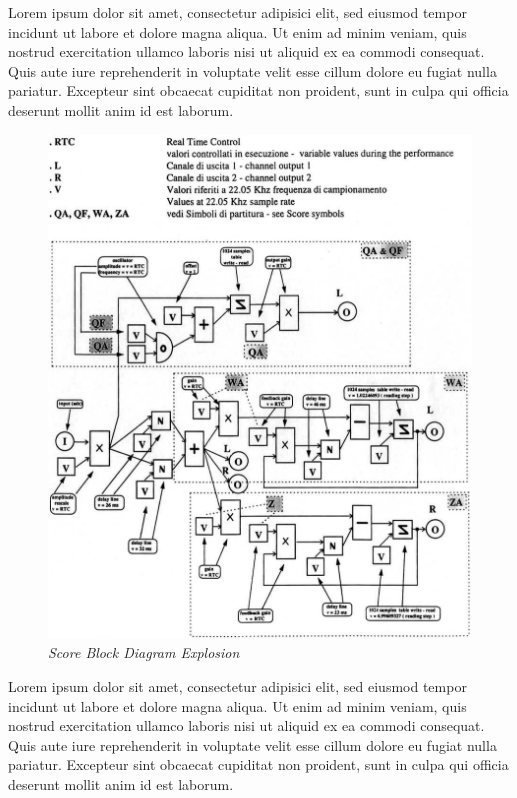 \documentclass[twoside,a4paper]{article}
\begin{document}
Lorem ipsum dolor sit amet, consectetur adipisici elit, sed eiusmod tempor
incidunt ut labore et dolore magna aliqua. Ut enim ad minim veniam, quis
nostrud exercitation ullamco laboris nisi ut aliquid ex ea commodi consequat.
Quis aute iure reprehenderit in voluptate velit esse cillum dolore eu fugiat
nulla pariatur. Excepteur sint obcaecat cupiditat non proident, sunt in culpa
qui officia deserunt mollit anim id est laborum.

\begin{figure}[ht]
\centerline{\includegraphics[scale=0.5]{img/2-comp}}
\caption{\label{fft_plot}{\it Score Block Diagram Explosion}}
\end{figure}

Lorem ipsum dolor sit amet, consectetur adipisici elit, sed eiusmod tempor
incidunt ut labore et dolore magna aliqua. Ut enim ad minim veniam, quis
nostrud exercitation ullamco laboris nisi ut aliquid ex ea commodi consequat.
Quis aute iure reprehenderit in voluptate velit esse cillum dolore eu fugiat
nulla pariatur. Excepteur sint obcaecat cupiditat non proident, sunt in culpa
qui officia deserunt mollit anim id est laborum.
\end{document}
